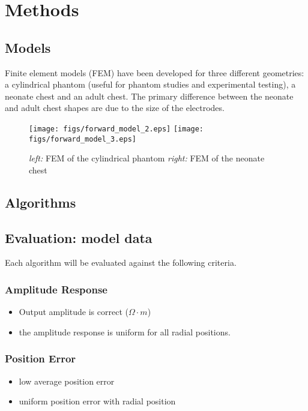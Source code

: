 \documentclass[letterpaper,twocolumn,11pt]{article}
\begin{document}
\section{Methods}
\subsection{Models}

Finite element models (FEM) have been developed for three
different geometries: a cylindrical phantom (useful for 
phantom studies and experimental testing), a
neonate chest and an adult chest. The primary difference
between the neonate and adult chest shapes are due to
the size of the electrodes.

\begin{figure}[bhtp]
\begin{center}
  \texttt{[image: figs/forward\_model\_2.eps]}
  \texttt{[image: figs/forward\_model\_3.eps]}

\caption{ \label{fig:fm2}
{\em left:} FEM of the cylindrical phantom
{\em right:} FEM of the neonate chest 
}
\end{center}
\end{figure}
\subsection{Algorithms}
\subsection{Evaluation: model data}

Each algorithm will be evaluated against the
following criteria.

\subsubsection{Amplitude Response}
   \begin{itemize}
   \item Output amplitude is correct ($\Omega \cdot m$)
   \item the amplitude response is uniform for all radial positions.
   \end{itemize}

\subsubsection{Position Error}
   \begin{itemize}
   \item low average position error
   \item uniform position error with radial position
   \end{itemize}
\end{document}
